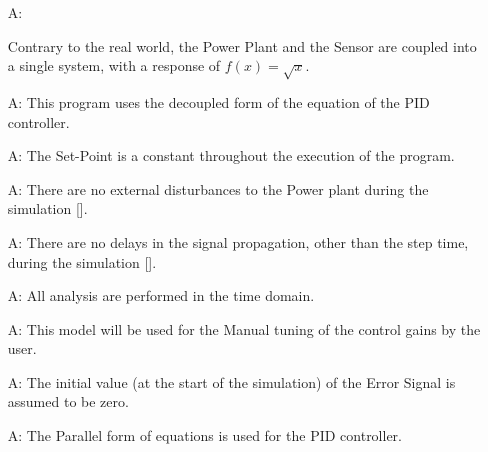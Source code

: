 \documentclass[12pt]{article}
\newcounter{assumpnum} %
\begin{document}
\begin{itemize}

\item[A\refstepcounter{assumpnum}\theassumpnum \label{A_PP}:]
	
    Contrary to the real world, the Power Plant and the Sensor are coupled 
    into a single system, with a response of $f(x) = \sqrt x$.

\item[A\refstepcounter{assumpnum}\theassumpnum \label{A_EQ}:] This program uses
 the decoupled form of the equation of the PID controller.

\item[A\refstepcounter{assumpnum}\theassumpnum \label{A_SP}:] The Set-Point is 
a constant throughout the execution of the program.

\item[A\refstepcounter{assumpnum}\theassumpnum \label{A_Attn}:] There are no 
external disturbances to the Power plant during the simulation [\cite{PID_Wiki}].

\item[A\refstepcounter{assumpnum}\theassumpnum \label{A_Delay}:] There are no 
delays in the signal propagation, other than the step time,
during the simulation [\cite{PID_Wiki}].

\item[A\refstepcounter{assumpnum}\theassumpnum \label{A_Domain}:] All analysis 
are performed in the time domain.

\item[A\refstepcounter{assumpnum}\theassumpnum \label{A_Tuning}:] This model 
will be used for the Manual tuning of the control gains by the user.

\item[A\refstepcounter{assumpnum}\theassumpnum \label{A_Initial}:] The initial
value (at the start of the simulation) of the Error Signal is assumed to be 
zero.

\item[A\refstepcounter{assumpnum}\theassumpnum \label{A_Parallel}:] The Parallel
form of equations is used for the PID controller.

\end{itemize}
\end{document}
